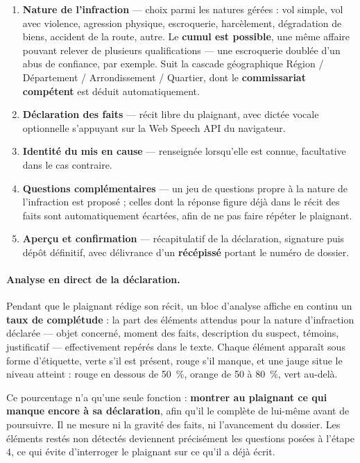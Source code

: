 \begin{enumerate}
    \item \textbf{Nature de l'infraction} — choix parmi les natures gérées : vol simple, vol avec violence, agression physique, escroquerie, harcèlement, dégradation de biens, accident de la route, autre. Le \textbf{cumul est possible}, une même affaire pouvant relever de plusieurs qualifications — une escroquerie doublée d'un abus de confiance, par exemple. Suit la cascade géographique Région / Département / Arrondissement / Quartier, dont le \textbf{commissariat compétent} est déduit automatiquement.
    \item \textbf{Déclaration des faits} — récit libre du plaignant, avec dictée vocale optionnelle s'appuyant sur la Web Speech API du navigateur.
    \item \textbf{Identité du mis en cause} — renseignée lorsqu'elle est connue, facultative dans le cas contraire.
    \item \textbf{Questions complémentaires} — un jeu de questions propre à la nature de l'infraction est proposé ; celles dont la réponse figure déjà dans le récit des faits sont automatiquement écartées, afin de ne pas faire répéter le plaignant.
    \item \textbf{Aperçu et confirmation} — récapitulatif de la déclaration, signature puis dépôt définitif, avec délivrance d'un \textbf{récépissé} portant le numéro de dossier.
\end{enumerate}

\paragraph{Analyse en direct de la déclaration.} Pendant que le plaignant rédige son récit, un bloc d'analyse affiche en continu un \textbf{taux de complétude} : la part des éléments attendus pour la nature d'infraction déclarée — objet concerné, moment des faits, description du suspect, témoins, justificatif — effectivement repérés dans le texte. Chaque élément apparaît sous forme d'étiquette, verte s'il est présent, rouge s'il manque, et une jauge situe le niveau atteint : rouge en dessous de 50~\%, orange de 50 à 80~\%, vert au-delà.

Ce pourcentage n'a qu'une seule fonction : \textbf{montrer au plaignant ce qui manque encore à sa déclaration}, afin qu'il le complète de lui-même avant de poursuivre. Il ne mesure ni la gravité des faits, ni l'avancement du dossier. Les éléments restés non détectés deviennent précisément les questions posées à l'étape 4, ce qui évite d'interroger le plaignant sur ce qu'il a déjà écrit.

